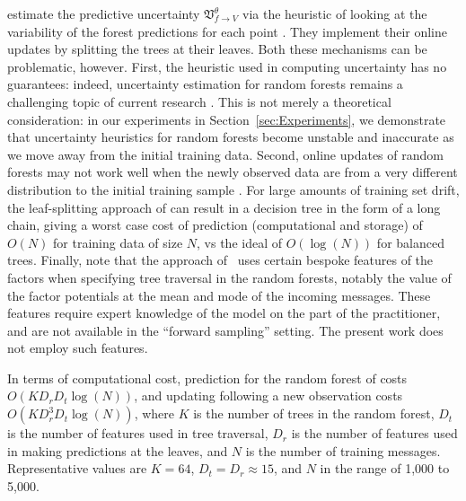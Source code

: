 \documentclass[english]{article}
\theoremstyle{plain}
\theoremstyle{plain}
\newcommand{\factor}{f}				%
\newcommand{\outV}{V}                         %
\newcommand{\uncertaintyMsg}[3]{{\mathfrak V}_{#1 \rightarrow #2}^{#3}}			%
\newcommand{\wjnote}[1]{ }
\newcommand{\secref}[1]{Section~\ref{#1}}
\begin{document}
\cite{Eslami2014} estimate the predictive uncertainty  $\uncertaintyMsg{\factor}{\outV}{\theta}$  via
the heuristic of looking at the variability of the forest predictions for each point \citep{CriSho13}.
They implement their online updates by splitting the trees at their
leaves.
Both these mechanisms can be problematic, however. First, the heuristic
used in computing uncertainty has no guarantees: indeed, uncertainty estimation for
random forests remains a challenging topic of current research \citep{Hutter2009}. This is not merely a theoretical
consideration: in our experiments in \secref{sec:Experiments}, we demonstrate that 
uncertainty heuristics for random forests become unstable and inaccurate as we move away from the initial
training data. Second, online updates of random forests may not work well
when the newly observed data are from a very different distribution to the
initial training sample \citep[e.g.][Fig. 3]{LakRoyTeh14}. 
For large amounts of training set drift, the
leaf-splitting approach of \citeauthor{Eslami2014} can result in a decision tree in the form of a long chain, giving a worst case
cost of prediction (computational and storage) of $O(N)$ for training data of size $N$, vs the ideal of $O(\log(N))$
for balanced trees.
Finally, note that the approach of \citeauthor{Eslami2014}\ uses certain bespoke features of the factors when
specifying tree traversal in the random forests,
notably the value of the factor potentials at the mean and mode of the incoming messages.
These features 
require expert knowledge of the model on the part
of the practitioner, and are not available in the ``forward sampling'' setting. The present
work does not employ such features.


In terms of computational cost, prediction for the random forest of \citeauthor{Eslami2014} costs $O(K D_r D_t \log(N))$,
and updating following a new observation costs  $O(K D_r^3 D_t \log(N))$,
where $K$ is the number of trees in the random forest, $D_t$
is the number of features used in tree traversal, $D_r$ is the number of features used in making predictions
at the leaves, and $N$ is the number of training messages.
Representative values are $K=64$, $D_t=D_r\approx 15$, and $N$ in the range of  1,000 to 5,000.
\end{document}
